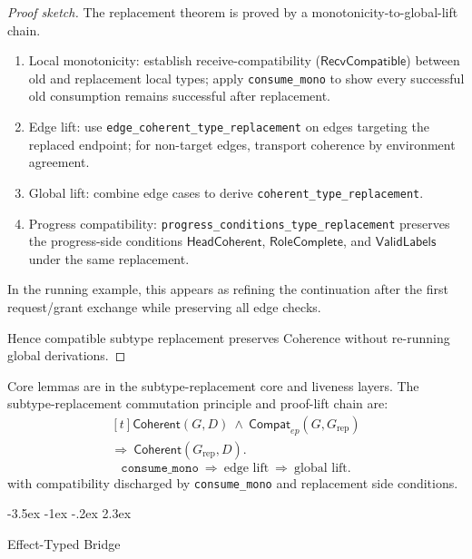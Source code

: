 \documentclass[a4paper,10pt,twocolumn,english]{article}
\makeatletter
\renewcommand{\section}{\@startsection{section}{1}{\z@}%
  {-3.5ex \@plus -1ex \@minus -.2ex}%
  {2.3ex}%
  {\raggedright\normalfont\large\bfseries}}
\numberwithin{equation}{section}
\theoremstyle{paperdef}
\theoremstyle{paperplain}
\theoremstyle{paperdef}
\theoremstyle{paperremark}
\newcommand{\Coherent}{\ensuremath{\mathsf{Coherent}}}
\newcommand{\RecvCompatible}{\ensuremath{\mathsf{RecvCompatible}}}
\makeatother
\begin{document}
\begin{proof}[Proof sketch]
	The replacement theorem is proved by a monotonicity-to-global-lift chain.

	\begin{enumerate}
		\item Local monotonicity: establish receive-compatibility ($\RecvCompatible$) between old and replacement local types; apply \nolinkurl{consume_mono} to show every successful old consumption remains successful after replacement.
		\item Edge lift: use \nolinkurl{edge_coherent_type_replacement} on edges targeting the replaced endpoint; for non-target edges, transport coherence by environment agreement.
		\item Global lift: combine edge cases to derive \nolinkurl{coherent_type_replacement}.
		\item Progress compatibility: \nolinkurl{progress_conditions_type_replacement} preserves the progress-side conditions $\mathsf{HeadCoherent}$, $\mathsf{RoleComplete}$, and $\mathsf{ValidLabels}$ under the same replacement.
	\end{enumerate}
	In the running example, this appears as refining the continuation after the
	first request/grant exchange while preserving all edge checks.

	Hence compatible subtype replacement preserves Coherence without re-running global derivations.
\end{proof}

Core lemmas are in the subtype-replacement core and liveness layers.
The subtype-replacement commutation principle and proof-lift chain are:
\begin{equation}
	\begin{aligned}[t]
		\Coherent(G,D)\ \land\ \mathsf{Compat}_{ep}(G,G_{\mathrm{rep}})
		\\
		\Longrightarrow\ \Coherent(G_{\mathrm{rep}},D).
	\end{aligned}
\end{equation}
\begin{equation}
	\texttt{consume\_mono}\ \Longrightarrow\ \text{edge lift}\ \Longrightarrow\ \text{global lift}.
\end{equation}
with compatibility discharged by \nolinkurl{consume_mono} and replacement side conditions.

\section{Effect-Typed Bridge}
\label{sec:bridge}
\end{document}
